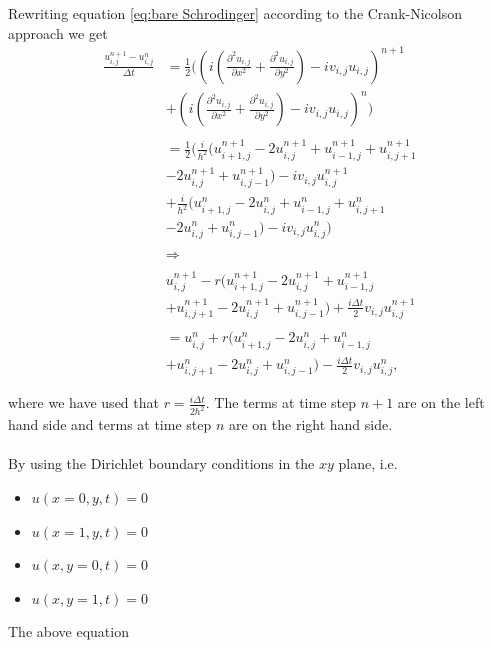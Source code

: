 \documentclass[english,notitlepage,reprint,nofootinbib]{revtex4-2}  %
\begin{document}
	\noindent
	Rewriting equation \ref{eq:bare Schrodinger}
	according to the Crank-Nicolson approach we get 
	\begin{equation}
		\begin{aligned}
		\frac{u^{n+1}_{i,j}-u^{n}_{i,j}}{\Delta t} &=  \frac{1}{2}\Big(\left(i\left(\frac{\partial^2 u_{i,j}}{\partial x^2} + \frac{\partial^2 u_{i,j}}{\partial y^2}\right) -i v_{i,j} u_{i,j}\right)^{n+1} \\
	    &+   \left(i(\frac{\partial^2 u_{i,j}}{\partial x^2} + \frac{\partial^2 u_{i,j}}{\partial y^2}) -i v_{i,j} u_{i,j}\right)^{n} \Big)\\
	    &\ \\
		&=  \frac{1}{2}\Big(    \frac{i}{h^2}\big(  u^{n+1}_{i+1,j}-2u^{n+1}_{i,j}+u^{n+1}_{i-1,j}   +u^{n+1}_{i,j+1}\\
		&-2u^{n+1}_{i,j}+u^{n+1}_{i,j-1}\big)-iv_{i,j}u^{n+1}_{i,j}\\
		&+ \frac{i}{h^2}\big(  u^{n}_{i+1,j}-2u^{n}_{i,j}+u^{n}_{i-1,j}   +u^{n}_{i,j+1}\\
		&-2u^{n}_{i,j}+u^{n}_{i,j-1}\big)-iv_{i,j}u^{n}_{i,j}      \Big)\\ 
		&\ \\
		&\Rightarrow \\ 
		&\ \\
		&u^{n+1}_{i,j} -r\Big(  u^{n+1}_{i+1,j}-2u^{n+1}_{i,j}+u^{n+1}_{i-1,j} \\
		&+u^{n+1}_{i,j+1}-2u^{n+1}_{i,j}+u^{n+1}_{i,j-1}\Big) +\frac{i\Delta t}{2}v_{i,j}u^{n+1}_{i,j}\\
		&\ \\
		&= u^n_{i,j}+ r\Big(  u^{n}_{i+1,j}-2u^{n}_{i,j}+u^{n}_{i-1,j}\\
		&+u^{n}_{i,j+1}-2u^{n}_{i,j}+u^{n}_{i,j-1}\Big)-\frac{i\Delta t}{2}v_{i,j}u^{n}_{i,j},
		\end{aligned}
	\end{equation}
	\twocolumngrid
	
	\noindent
	where we have used that $r = \frac{i\Delta t}{2h^2}$. The terms at time
	step $n+1$ are on the left hand side and terms at time step $n$ are on the right
	hand side.\\ \\
	
	\noindent
	By using the Dirichlet boundary conditions in the $xy$ plane, i.e.
	\begin{itemize}
		\item $u(x=0, y, t) = 0$
		\item $u(x=1, y, t) = 0$
		\item $u(x, y=0, t) = 0$ 
		\item $u(x, y=1, t) = 0$
	\end{itemize}
	The above equation 
\end{document}

